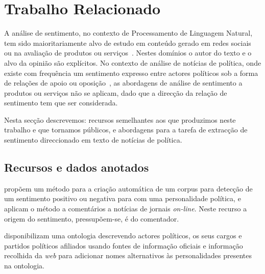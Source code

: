 \documentclass[a4paper, twocolumn, 11pt, twoside]{article}
\begin{document}
\section{Trabalho Relacionado}
\label{sec_related_work}
A análise de sentimento, no contexto de Processamento de Linguagem Natural, tem sido maioritariamente alvo de estudo em conteúdo gerado em redes sociais~\citep{10.1145/3185045} ou na avaliação de produtos ou serviços~\citep{pontiki-etal-2016-semeval}. Nestes domínios o autor do texto e o alvo da opinião são explícitos. No contexto de análise de notícias de política, onde existe com frequência um sentimento expresso entre actores políticos sob a forma de relações de apoio ou oposição~\citep{balahur2009opinion, balahur-etal-2010-sentiment}, as abordagens de análise de sentimento a produtos ou serviços não se aplicam, dado que a direcção da relação de sentimento tem que ser considerada.

Nesta secção descrevemos: recursos semelhantes aos que produzimos neste trabalho e que tornamos públicos, e abordagens para a tarefa de extracção de sentimento direccionado em texto de notícias de política.

\subsection{Recursos e dados anotados}


\cite{10.1145/1651461.1651468} propõem um método para a criação automática de um corpus para detecção de um sentimento positivo ou negativa para com uma personalidade política, e aplicam o método a comentários a notícias de jornais \textit{on-line}. Neste recurso a origem do sentimento, pressupõem-se, é do comentador.

\cite{moreira2013tracking} disponibilizam uma ontologia descrevendo actores políticos, os seus cargos e partidos políticos afiliados usando fontes de informação oficiais e informação recolhida da \textit{web} para adicionar nomes alternativos às personalidades presentes na ontologia.
\end{document}
